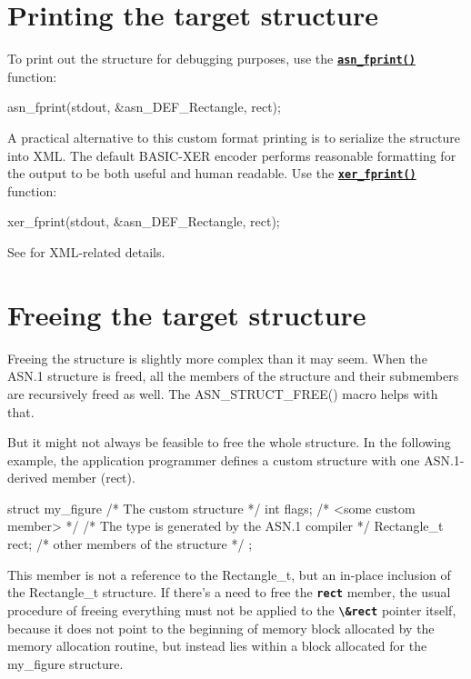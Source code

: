\documentclass[english,oneside,12pt]{book}
\newcommand{\api}[2]{\hyperref[#1]{\code{#2}}}
\newcommand{\code}[1]{\texttt{\textbf{\lstinline{#1}}}}
\begin{document}
\section{\label{sec:Printing-the-target}Printing the target structure}

To print out the structure for debugging purposes, use the
\api{sec:asn_fprint}{asn_fprint()} function:
\begin{codesample}
asn_fprint(stdout, &asn_DEF_Rectangle, rect);
\end{codesample}

A practical alternative to this custom format printing is to serialize
the structure into XML. The default BASIC-XER encoder performs reasonable
formatting for the output to be both useful and human readable.
Use the \api{sec:xer_fprint}{xer_fprint()} function:
\begin{codesample}
xer_fprint(stdout, &asn_DEF_Rectangle, rect);
\end{codesample}
See  for XML-related details.

\section{\label{sec:Freeing-the-target}Freeing the target structure}

Freeing the structure is slightly more complex than it may seem.
When the ASN.1 structure is freed, all the members of the structure
and their submembers are recursively freed as well.
The ASN\_STRUCT\_FREE() macro helps with that.

But it might not always be feasible to free the whole structure.
In the following example, the application programmer defines a custom
structure with one ASN.1-derived member (rect).
\begin{codesample}
struct my_figure {       /* The custom structure */
    int flags;           /* <some custom member> */
    /* The type is generated by the ASN.1 compiler */
    Rectangle_t rect;
    /* other members of the structure */
};
\end{codesample}
This member is not a reference to the Rectangle\_t, but an in-place inclusion
of the Rectangle\_t structure.
If there's a need to free the \code{rect} member, the usual procedure of
freeing everything must not be applied to the \code{\&rect} pointer itself,
because it does not point to the beginning of memory block allocated by
the memory allocation routine, but instead lies within a block allocated for
the my\_figure structure.
\end{document}
